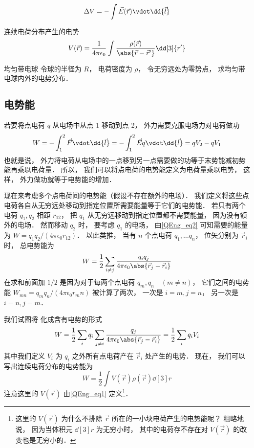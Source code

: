
\begin{equation}
\Delta V = -\int \vec E(\vec r) \vdot \dd{\vec l}
\end{equation}

连续电荷分布产生的电势
\begin{equation}\label{QEng_eq1}
V(\vec r) = \frac{1}{4\pi\epsilon_0} \int \frac{\rho(\vec r)}{\abs{\vec r - \vec r'}} \dd[3]{r'}
\end{equation}

\begin{exam}{均匀带电球}
令球的半径为 $R$， 电荷密度为 $\rho$， 令无穷远处为零势点， 求均匀带电球内外的电势分布．

\end{exam}

\subsection{电势能}
若要将点电荷 $q$ 从电场中从点 1 移动到点 2， 外力需要克服电场力对电荷做功
\begin{equation}\label{QEng_eq2}
W = -\int_1^2 \vec F \vdot \dd{\vec l} = -\int_1^2 \vec E q \vdot \dd{\vec l}
= qV_2 - qV_1
\end{equation}
也就是说， 外力将电荷从电场中的一点移到另一点需要做的功等于末势能减初势能再乘以电荷量． 所以， 我们可以将点电荷的电势能定义为电荷量乘以电势， 这样， 外力做功就等于电势能的增加．

现在来考虑多个点电荷间的电势能（假设不存在额外的电场）． 我们定义将这些点电荷各自从无穷远处移动到指定位置所需要能量等于它们的电势能． 若只有两个电荷 $q_1, q_2$ 相距 $r_12$， 把 $q_1$ 从无穷远移动到指定位置都不需要能量， 因为没有额外的电场． 然而移动 $q_2$ 时， 要考虑 $q_1$ 的电场， 由\autoref{QEng_eq2} 可知需要的能量为 $W = q_1q_2/(4\pi\epsilon_0 r_12)$． 以此类推， 当有 $n$ 个点电荷 $q_1, \dots q_n$， 位矢分别为 $\vec r_i$ 时， 总电势能为
\begin{equation}\label{QEng_eq3}
W = \frac12\sum_{i \neq j} \frac{q_i q_j}{4\pi\epsilon_0 \abs{\vec r_j - \vec r_i}}
\end{equation}
在求和前面加 $1/2$ 是因为对于每两个点电荷 $q_m, q_n\quad (m \neq n)$， 它们之间的电势能 $W_{mn} = q_m q_n/(4\pi\epsilon_0 r_mn)$ 被计算了两次， 一次是 $i = m, j = n$， 另一次是 $i = n, j = m$．

我们试图将\label{QEng_eq3} 化成含有电势的形式
\begin{equation}
W = \frac12 \sum_i q_i \sum_{j\neq i} \frac{q_j}{4\pi\epsilon_0\abs{\vec r_j - \vec r_i}}
=\frac12 \sum_i q_i V_i
\end{equation}
其中我们定义 $V_i$ 为 $q_i$ 之外所有点电荷产在 $\vec r_i$ 处产生的电势． 现在， 我们可以写出连续电荷分布的电势能为
\begin{equation}\label{QEng_eq6}
W = \frac 12 \int V(\vec r) \rho(\vec r) \dd[3]{r}
\end{equation}
注意这里的 $V(\vec r)$ 由\autoref{QEng_eq1} 定义\footnote{这里的 $V(\vec r)$ 为什么不排除 $\vec r$ 所在的一小块电荷产生的电势能呢？ 粗略地说， 因为当体积元 $\dd[3]{r}$ 为无穷小时， 其中的电荷存不存在对 $V(\vec r)$ 的改变也是无穷小的．}．